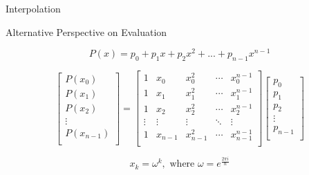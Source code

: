 \documentclass{beamer}
\begin{document}
        \begin{frame}{Interpolation}
        
    Alternative Perspective on Evaluation

    $$P(x) = p_0 + p_1x + p_2x^2 + ... + p_{n-1}x^{n-1}$$
    
    \begin{equation*}


    \begin{bmatrix}
            P(x_0) \\
           P(x_1)\\
            P(x_2)\\
            \vdots \\
            P(x_{n-1}) \\
        \end{bmatrix}
        =
        \begin{bmatrix}
            1 & x_0 & x_0^2 & \cdots & x_0^{n-1} \\
            1 & x_1 & x_1^2 & \cdots & x_1^{n-1} \\
            1 & x_2 & x_2^2 & \cdots & x_2^{n-1} \\
            \vdots & \vdots & \vdots & \ddots & \vdots \\
            1 & x_{n-1} & x_{n-1}^2 & \cdots & x_{n-1}^{n-1} \\
        \end{bmatrix}
        \begin{bmatrix}
            p_0 \\
            p_1 \\
            p_2 \\
            \vdots \\
            p_{n-1} \\
        \end{bmatrix}
       
    \end{equation*}

    
$$ x_k = \omega^k, \text{ where } \omega = e^{\frac{2\pi i}{n}} $$
\end{frame}
\end{document}
